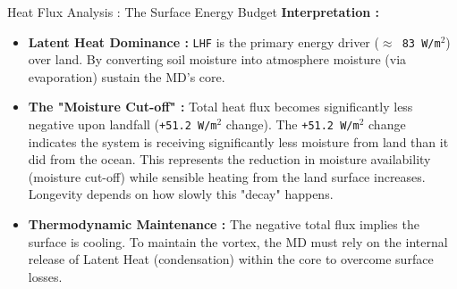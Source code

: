 \documentclass[8pt, aspectratio=169]{beamer}
\begin{document}
\begin{frame}[label=budget]{Heat Flux Analysis : The Surface Energy Budget}
    \vspace{0.4cm}
    \footnotesize
    \textbf{Interpretation :}
        \begin{itemize}
            \item \textbf{Latent Heat Dominance :} \texttt{LHF} is the primary energy driver (\texttt{$\approx$ 83 W/m$^2$}) over land. By converting soil moisture into atmosphere moisture (via evaporation) sustain  the MD's core.
            \item \textbf{The "Moisture Cut-off" :} Total heat flux becomes significantly less negative upon landfall (\texttt{+51.2 W/m$^2$} change).  The \texttt{+51.2 W/m$^2$} change indicates the system is receiving significantly less moisture from land than it did from the ocean. This represents the reduction in moisture availability (moisture cut-off) while sensible heating from the land surface increases. Longevity depends on how slowly this "decay" happens.
            \item \textbf{Thermodynamic Maintenance :} The negative total flux implies the surface is cooling. To maintain the vortex, the MD must rely on the internal release of Latent Heat (condensation) within the core to overcome surface losses.
        \end{itemize}

\end{frame}
\end{document}
